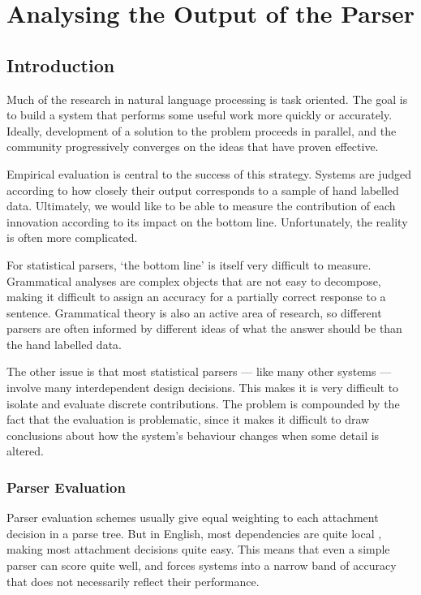 \chapter{Analysing the Output of the \candc Parser}
\label{chapter:analysis}

\section{Introduction}

Much of the research in natural language processing is task oriented. The goal is to build a system that performs some useful work more quickly or accurately. Ideally, development of a solution to the problem proceeds in parallel, and the community progressively converges on the ideas that have proven effective.

Empirical evaluation is central to the success of this strategy. Systems are judged according to how closely their output corresponds to a sample of hand labelled data. Ultimately, we would like to be able to measure the contribution of each innovation according to its impact on the bottom line. Unfortunately, the reality is often more complicated.

For statistical parsers, `the bottom line' is itself very difficult to measure. Grammatical analyses are complex objects that are not easy to decompose, making it difficult to assign an accuracy for a partially correct response to a sentence. Grammatical theory is also an active area of research, so different parsers are often informed by different ideas of what the answer should be than the hand labelled data.

The other issue is that most statistical parsers --- like many other \nlp systems --- involve many interdependent design decisions. This makes it is very difficult to isolate and evaluate discrete contributions. The problem is compounded by the fact that the evaluation is problematic, since it makes it difficult to draw conclusions about how the system's behaviour changes when some detail is altered.

\subsection{Parser Evaluation}

Parser evaluation schemes usually give equal weighting to each attachment decision in a parse tree. But in English, most dependencies are quite local \cn, making most attachment decisions quite easy. This means that even a simple parser can score quite well, and forces systems into a narrow band of accuracy that does not necessarily reflect their performance.



